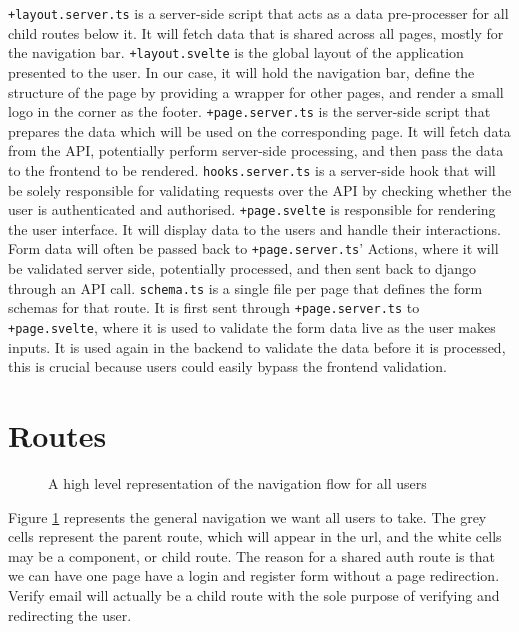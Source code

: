 \texttt{+layout.server.ts} is a server-side script that acts as a data pre-processer for all child routes below it. It will fetch data that is shared across all pages, mostly for the navigation bar. \texttt{+layout.svelte} is the global layout of the application presented to the user. In our case, it will hold the navigation bar, define the structure of the page by providing a wrapper for other pages, and render a small logo in the corner as the footer. \texttt{+page.server.ts} is the server-side script that prepares the data which will be used on the corresponding page. It will fetch data from the API, potentially perform server-side processing, and then pass the data to the frontend to be rendered. \texttt{hooks.server.ts} is a server-side hook that will be solely responsible for validating requests over the API by checking whether the user is authenticated and authorised. \texttt{+page.svelte} is responsible for rendering the user interface. It will display data to the users and handle their interactions. Form data will often be passed back to \texttt{+page.server.ts}' Actions, where it will be validated server side, potentially processed, and then sent back to django through an API call. \texttt{schema.ts} is a single file per page that defines the form schemas for that route. It is first sent through \texttt{+page.server.ts} to \texttt{+page.svelte}, where it is used to validate the form data live as the user makes inputs. It is used again in the backend to validate the data before it is processed, this is crucial because users could easily bypass the frontend validation.

\section{Routes}
\begin{figure}[h]
\centering
{}
\vspace{-5pt}
\caption{A high level representation of the navigation flow for all users}
\label{fig:ui-all}
\end{figure}
\vspace{-5pt}

Figure \ref{fig:ui-all} represents the general navigation we want all users to take. The grey cells represent the parent route, which will appear in the url, and the white cells may be a component, or child route. The reason for a shared auth route is that we can have one page have a login and register form without a page redirection. Verify email will actually be a child route with the sole purpose of verifying and redirecting the user. 


